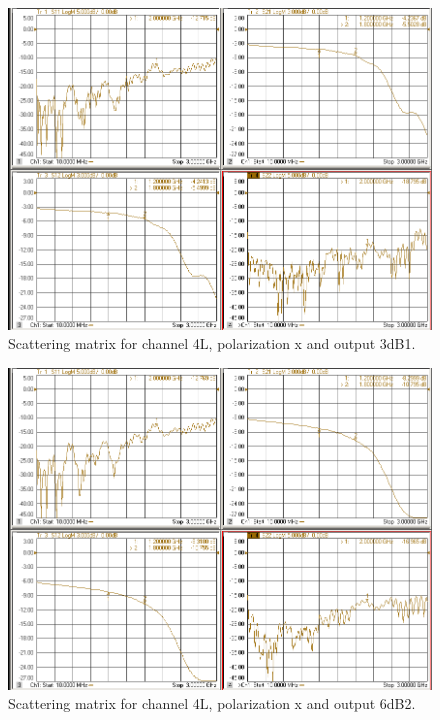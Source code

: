 \documentclass[12pt,a4paper,oneside]{article}
\begin{document}
\begin{figure}[H]
\centering
\includegraphics[width=0.9\linewidth]{VNA_results/4Lx_3dB1.png}
\caption{Scattering matrix for channel 4L, polarization x and output 3dB1.}
\label{fig:4Lx_3dB1}
\end{figure}


\begin{figure}[H]
\centering
\includegraphics[width=0.9\linewidth]{VNA_results/4Lx_6dB2.png}
\caption{Scattering matrix for channel 4L, polarization x and output 6dB2.}
\label{fig:4Lx_6dB2}
\end{figure}
\end{document}
